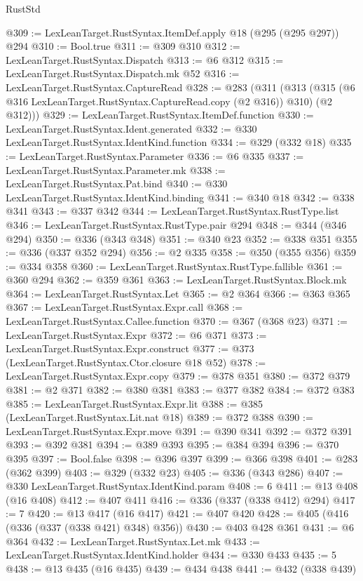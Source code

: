 \begin{lexlean}{RustStd}
\begin{coremodule}
@309 := LexLeanTarget.RustSyntax.ItemDef.apply @18 (@295 (@295 @297)) @294
@310 := Bool.true
@311 := @309 @310
@312 := LexLeanTarget.RustSyntax.Dispatch
@313 := @6 @312
@315 := LexLeanTarget.RustSyntax.Dispatch.mk @52
@316 := LexLeanTarget.RustSyntax.CaptureRead
@328 := @283
    (@311
      (@313 (@315 (@6 @316 LexLeanTarget.RustSyntax.CaptureRead.copy (@2 @316)) @310) (@2 @312)))
@329 := LexLeanTarget.RustSyntax.ItemDef.function
@330 := LexLeanTarget.RustSyntax.Ident.generated
@332 := @330 LexLeanTarget.RustSyntax.IdentKind.function
@334 := @329 (@332 @18)
@335 := LexLeanTarget.RustSyntax.Parameter
@336 := @6 @335
@337 := LexLeanTarget.RustSyntax.Parameter.mk
@338 := LexLeanTarget.RustSyntax.Pat.bind
@340 := @330 LexLeanTarget.RustSyntax.IdentKind.binding
@341 := @340 @18
@342 := @338 @341
@343 := @337 @342
@344 := LexLeanTarget.RustSyntax.RustType.list
@346 := LexLeanTarget.RustSyntax.RustType.pair @294
@348 := @344 (@346 @294)
@350 := @336 (@343 @348)
@351 := @340 @23
@352 := @338 @351
@355 := @336 (@337 @352 @294)
@356 := @2 @335
@358 := @350 (@355 @356)
@359 := @334 @358
@360 := LexLeanTarget.RustSyntax.RustType.fallible
@361 := @360 @294
@362 := @359 @361
@363 := LexLeanTarget.RustSyntax.Block.mk
@364 := LexLeanTarget.RustSyntax.Let
@365 := @2 @364
@366 := @363 @365
@367 := LexLeanTarget.RustSyntax.Expr.call
@368 := LexLeanTarget.RustSyntax.Callee.function
@370 := @367 (@368 @23)
@371 := LexLeanTarget.RustSyntax.Expr
@372 := @6 @371
@373 := LexLeanTarget.RustSyntax.Expr.construct
@377 := @373 (LexLeanTarget.RustSyntax.Ctor.closure @18 @52)
@378 := LexLeanTarget.RustSyntax.Expr.copy
@379 := @378 @351
@380 := @372 @379
@381 := @2 @371
@382 := @380 @381
@383 := @377 @382
@384 := @372 @383
@385 := LexLeanTarget.RustSyntax.Expr.lit
@388 := @385 (LexLeanTarget.RustSyntax.Lit.nat @18)
@389 := @372 @388
@390 := LexLeanTarget.RustSyntax.Expr.move
@391 := @390 @341
@392 := @372 @391
@393 := @392 @381
@394 := @389 @393
@395 := @384 @394
@396 := @370 @395
@397 := Bool.false
@398 := @396 @397
@399 := @366 @398
@401 := @283 (@362 @399)
@403 := @329 (@332 @23)
@405 := @336 (@343 @286)
@407 := @330 LexLeanTarget.RustSyntax.IdentKind.param
@408 := 6
@411 := @13 @408 (@16 @408)
@412 := @407 @411
@416 := @336 (@337 (@338 @412) @294)
@417 := 7
@420 := @13 @417 (@16 @417)
@421 := @407 @420
@428 := @405 (@416 (@336 (@337 (@338 @421) @348) @356))
@430 := @403 @428 @361
@431 := @6 @364
@432 := LexLeanTarget.RustSyntax.Let.mk
@433 := LexLeanTarget.RustSyntax.IdentKind.holder
@434 := @330 @433
@435 := 5
@438 := @13 @435 (@16 @435)
@439 := @434 @438
@441 := @432 (@338 @439)

\end{coremodule}
\end{lexlean}
